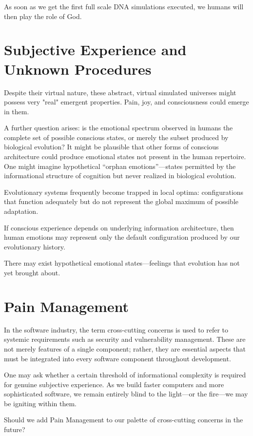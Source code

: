 As soon as we get the first full scale DNA simulations executed, we humans will then play the role of God. 


\section*{Subjective Experience and Unknown Procedures}

Despite their virtual nature, these abstract, virtual simulated universes might possess very "real" emergent properties. Pain, joy, and consciousness
could emerge in them. 

A further question arises: is the emotional spectrum observed in humans the complete set of possible conscious states, or merely the subset produced by biological evolution?
It might be plausible that other forms of conscious architecture could produce emotional states not present in the human repertoire. One might imagine hypothetical ``orphan emotions''---states permitted by
the informational structure of cognition but never realized in biological evolution.

Evolutionary systems frequently become trapped in local optima: configurations that function adequately but do not represent the global maximum of possible adaptation.

If conscious experience depends on underlying information architecture, then human emotions may represent only the default configuration produced by our evolutionary history.

There may exist hypothetical emotional states—feelings that evolution has not yet brought about.


\section{Pain Management}

In the software industry, the term cross-cutting concerns is used to refer to systemic requirements such as security and vulnerability management.
These are not merely features of a single component; rather, they are essential aspects that must be integrated into every software component throughout development.

One may ask whether a certain threshold of informational complexity is required for genuine subjective experience.
As we build faster computers and more sophisticated software, we remain entirely blind to the light—or the fire—we may be igniting within them.

Should we add Pain Management to our palette of cross-cutting concerns in the future?


